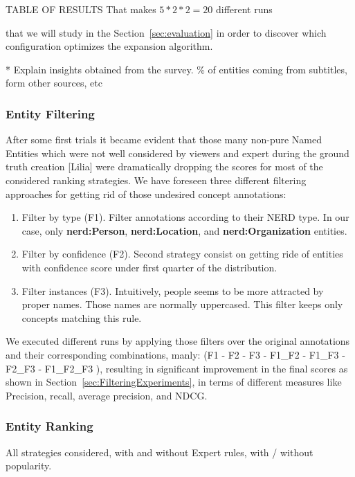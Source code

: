 \documentclass{llncs}
\begin{document}
TABLE OF RESULTS
That makes $5 * 2 * 2 = 20$ different runs 

that we will study in the Section~\ref{sec:evaluation} in order to discover which configuration optimizes the expansion algorithm.

* Explain insights obtained from the survey. \% of entities coming from subtitles, form other sources, etc

\subsubsection{Entity Filtering}
\label{sec:settingsFiltering}

After some first trials it became evident that those many non-pure Named Entities which were not well considered by viewers and expert during the ground truth creation [Lilia] were dramatically dropping the scores for most of the considered ranking strategies. We have foreseen three different filtering approaches for getting rid of those undesired concept annotations:

\begin{enumerate}
\item Filter by type (F1). Filter annotations according to their NERD type. In our case, only \textbf{nerd:Person}, \textbf{nerd:Location}, and \textbf{nerd:Organization} entities.
\item Filter by confidence (F2). Second strategy consist on getting ride of entities with confidence score under first quarter of the distribution.
\item Filter instances (F3). Intuitively, people seems to be more attracted by proper names. Those names are normally uppercased. This filter keeps only concepts matching this rule.
\end{enumerate}

We executed different runs by applying those filters over the original annotations and their corresponding combinations, manly: (F1 - F2 - F3 - F1\_F2 - F1\_F3 - F2\_F3 - F1\_F2\_F3 ), resulting in significant improvement in the final scores as shown in Section~\ref{sec:FilteringExperiments}, in terms of different measures like Precision, recall, average precision, and NDCG.

\subsubsection{Entity Ranking}
\label{sec:settingsRanking}

All strategies considered, with and without Expert rules, with / without popularity.
\end{document}
